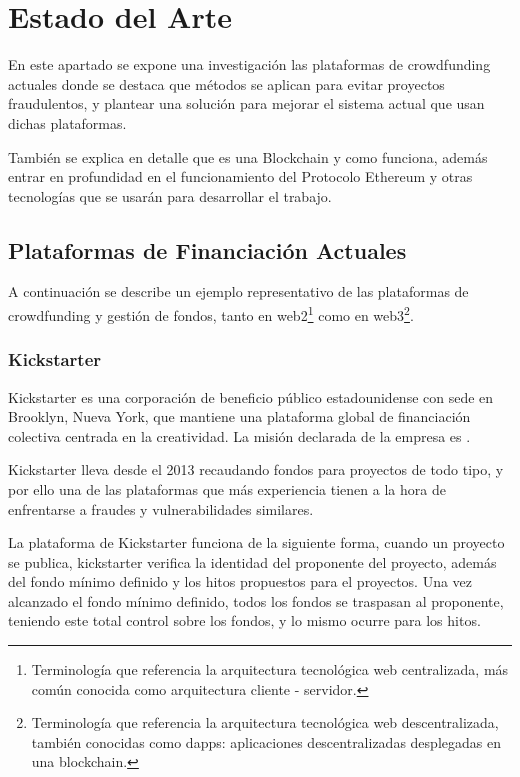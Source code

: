 \section{Estado del Arte}

En este apartado se expone una investigación las plataformas de crowdfunding actuales donde se destaca que métodos se aplican para evitar proyectos fraudulentos, y plantear una solución para mejorar el sistema actual que usan dichas plataformas.

\bigskip

También se explica en detalle que es una Blockchain y como funciona, además entrar en profundidad en el funcionamiento del Protocolo Ethereum y otras tecnologías que se usarán para desarrollar el trabajo.

\subsection{Plataformas de Financiación Actuales}

A continuación se describe un ejemplo representativo de las plataformas de crowdfunding y gestión de fondos, tanto en web2\footnote{Terminología que referencia la arquitectura tecnológica web centralizada, más común conocida como arquitectura cliente - servidor.} como en web3\footnote{Terminología que referencia la arquitectura tecnológica web descentralizada, también conocidas como dapps: aplicaciones descentralizadas desplegadas en una blockchain.}.

\subsubsection{Kickstarter}

Kickstarter\cite{ContributorstoWikimediaprojects2023Jan} es una corporación de beneficio público estadounidense con sede en Brooklyn, Nueva York, que mantiene una plataforma global de financiación colectiva centrada en la creatividad. La misión declarada de la empresa es .

\bigskip

Kickstarter lleva desde el 2013 recaudando fondos para proyectos de todo tipo, y por ello una de las plataformas que más experiencia tienen a la hora de enfrentarse a fraudes y vulnerabilidades similares.

\bigskip

La plataforma de Kickstarter funciona de la siguiente forma, cuando un proyecto se publica, kickstarter verifica la identidad del proponente del proyecto, además del fondo mínimo definido y los hitos propuestos para el proyectos. Una vez alcanzado el fondo mínimo definido, todos los fondos se traspasan al proponente, teniendo este total control sobre los fondos, y lo mismo ocurre para los hitos.

